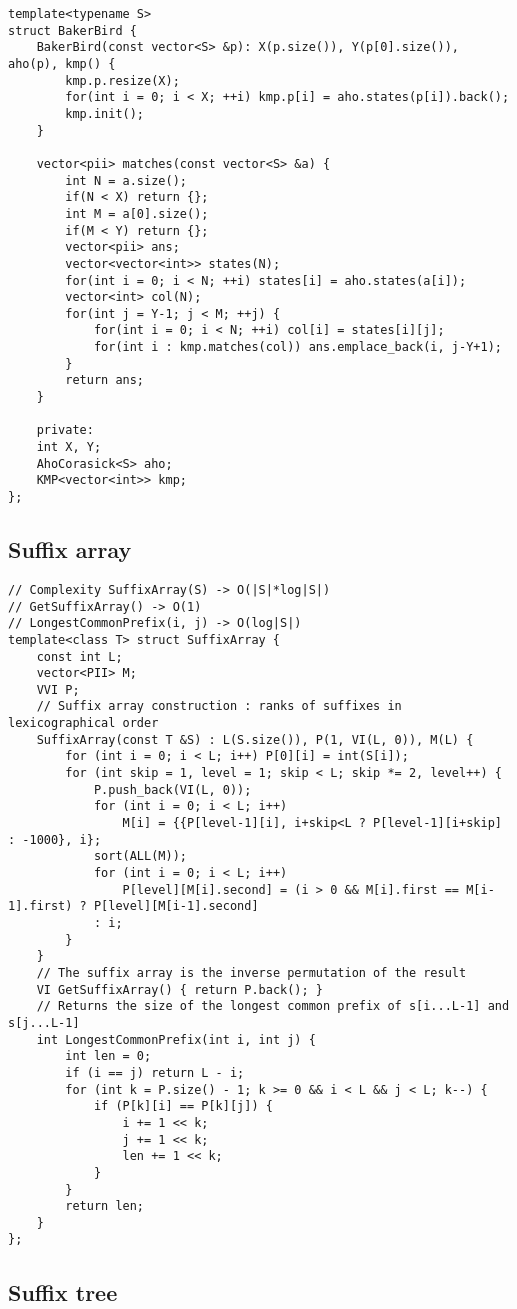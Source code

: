 \documentclass[a4paper,9pt]{article}
\begin{document}
\begin{lstlisting}
template<typename S>
struct BakerBird {
	BakerBird(const vector<S> &p): X(p.size()), Y(p[0].size()), aho(p), kmp() {
		kmp.p.resize(X);
		for(int i = 0; i < X; ++i) kmp.p[i] = aho.states(p[i]).back();
		kmp.init();
	}
	
	vector<pii> matches(const vector<S> &a) {
		int N = a.size();
		if(N < X) return {};
		int M = a[0].size();
		if(M < Y) return {};
		vector<pii> ans;
		vector<vector<int>> states(N);
		for(int i = 0; i < N; ++i) states[i] = aho.states(a[i]);
		vector<int> col(N);
		for(int j = Y-1; j < M; ++j) {
			for(int i = 0; i < N; ++i) col[i] = states[i][j];
			for(int i : kmp.matches(col)) ans.emplace_back(i, j-Y+1);
		}
		return ans;
	}
	
	private:
	int X, Y;
	AhoCorasick<S> aho;
	KMP<vector<int>> kmp;
};
\end{lstlisting}

\subsection{Suffix array}

\begin{lstlisting}
// Complexity SuffixArray(S) -> O(|S|*log|S|)
// GetSuffixArray() -> O(1)
// LongestCommonPrefix(i, j) -> O(log|S|)
template<class T> struct SuffixArray {
	const int L;
	vector<PII> M;
	VVI P;
	// Suffix array construction : ranks of suffixes in lexicographical order
	SuffixArray(const T &S) : L(S.size()), P(1, VI(L, 0)), M(L) {
		for (int i = 0; i < L; i++) P[0][i] = int(S[i]);
		for (int skip = 1, level = 1; skip < L; skip *= 2, level++) {
			P.push_back(VI(L, 0));
			for (int i = 0; i < L; i++)
				M[i] = {{P[level-1][i], i+skip<L ? P[level-1][i+skip] : -1000}, i};
			sort(ALL(M));
			for (int i = 0; i < L; i++)
				P[level][M[i].second] = (i > 0 && M[i].first == M[i-1].first) ? P[level][M[i-1].second]
			: i;
		}
	}
	// The suffix array is the inverse permutation of the result
	VI GetSuffixArray() { return P.back(); }
	// Returns the size of the longest common prefix of s[i...L-1] and s[j...L-1]
	int LongestCommonPrefix(int i, int j) {
		int len = 0;
		if (i == j) return L - i;
		for (int k = P.size() - 1; k >= 0 && i < L && j < L; k--) {
			if (P[k][i] == P[k][j]) {
				i += 1 << k;
				j += 1 << k;
				len += 1 << k;
			}
		}
		return len;
	}
};
\end{lstlisting}

\subsection{Suffix tree}
\end{document}
